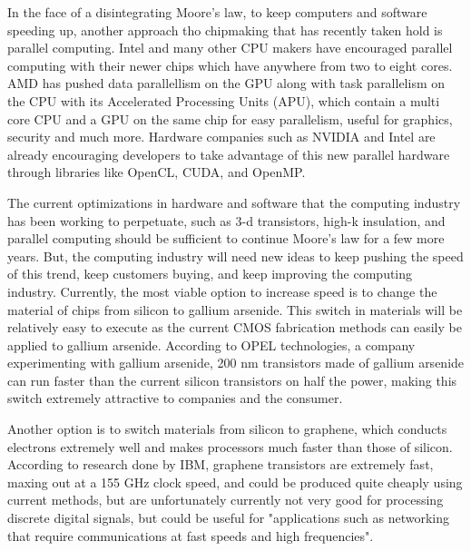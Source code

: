 \documentclass[12pt]{article}
\begin{document}
In the face of a disintegrating Moore's law, to keep computers and software speeding up, another approach tho chipmaking that has recently taken hold is parallel computing. Intel and many other CPU makers have encouraged parallel computing with their newer chips which have anywhere from two to eight cores. AMD has pushed data parallellism on the GPU along with task parallelism on the CPU with its Accelerated Processing Units (APU), which contain a multi core CPU and a GPU on the same chip for easy parallelism, useful for graphics, security and much more. Hardware companies such as NVIDIA and Intel are already encouraging developers to take advantage of this new parallel hardware through libraries like OpenCL, CUDA, and OpenMP\cite{chacos_breaking_2013}.

The current optimizations in hardware and software that the computing industry has been working to perpetuate, such as 3-d transistors, high-k insulation, and parallel computing should be sufficient to continue Moore's law for a few more years. But, the computing industry will need new ideas to keep pushing the speed of this trend, keep customers buying, and keep improving the computing industry. Currently, the most viable option to increase speed is to change the material of chips from silicon to gallium arsenide. This switch in materials will be relatively easy to execute as the current CMOS fabrication methods can easily be applied to gallium arsenide. According to OPEL technologies, a company experimenting with gallium arsenide, 200 nm transistors made of gallium arsenide can run faster than the current silicon transistors on half the power, making this switch extremely attractive to companies and the consumer\cite{chacos_breaking_2013}. 

Another option is to switch materials from silicon to graphene, which conducts electrons extremely well and makes processors much faster than those of silicon. According to research done by IBM, graphene transistors are extremely fast, maxing out at a 155 GHz clock speed, and could be produced quite cheaply using current methods, but are unfortunately currently not very good for processing discrete digital signals, but could be useful for "applications such as networking that require communications at fast speeds and high frequencies"\cite{shah_ibm_2011}.
\end{document}
